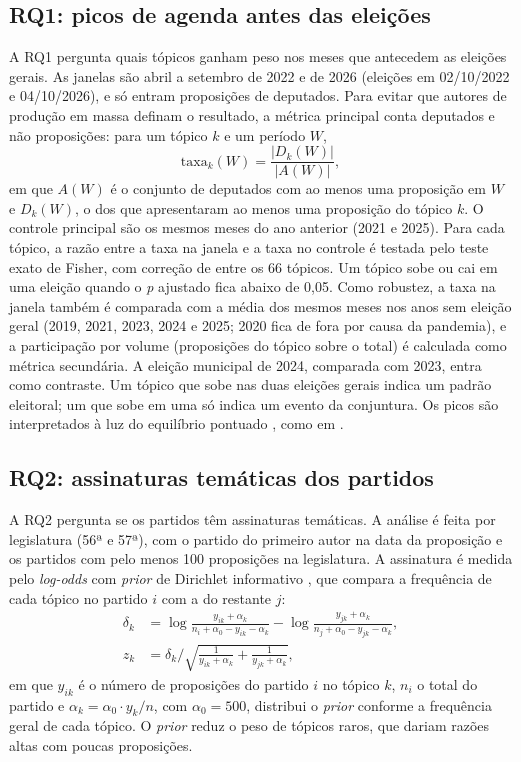 \subsection{RQ1: picos de agenda antes das eleições}
\label{subsec:rq1}

A RQ1 pergunta quais tópicos ganham peso nos meses que antecedem as eleições gerais. As janelas são abril a setembro de 2022 e de 2026 (eleições em 02/10/2022 e 04/10/2026), e só entram proposições de deputados. Para evitar que autores de produção em massa definam o resultado, a métrica principal conta deputados e não proposições: para um tópico $k$ e um período $W$,
\begin{equation}
\text{taxa}_k(W) = \frac{|D_k(W)|}{|A(W)|},
\end{equation}
em que $A(W)$ é o conjunto de deputados com ao menos uma proposição em $W$ e $D_k(W)$, o dos que apresentaram ao menos uma proposição do tópico $k$. O controle principal são os mesmos meses do ano anterior (2021 e 2025). Para cada tópico, a razão entre a taxa na janela e a taxa no controle é testada pelo teste exato de Fisher, com correção de \citet{benjamini1995controlling} entre os 66 tópicos. Um tópico sobe ou cai em uma eleição quando o \textit{p} ajustado fica abaixo de 0,05. Como robustez, a taxa na janela também é comparada com a média dos mesmos meses nos anos sem eleição geral (2019, 2021, 2023, 2024 e 2025; 2020 fica de fora por causa da pandemia), e a participação por volume (proposições do tópico sobre o total) é calculada como métrica secundária. A eleição municipal de 2024, comparada com 2023, entra como contraste. Um tópico que sobe nas duas eleições gerais indica um padrão eleitoral; um que sobe em uma só indica um evento da conjuntura. Os picos são interpretados à luz do equilíbrio pontuado \citep{baumgartner1993agendas}, como em \citet{greene2017exploring}.

\subsection{RQ2: assinaturas temáticas dos partidos}
\label{subsec:rq2}

A RQ2 pergunta se os partidos têm assinaturas temáticas. A análise é feita por legislatura (56ª e 57ª), com o partido do primeiro autor na data da proposição e os partidos com pelo menos 100 proposições na legislatura. A assinatura é medida pelo \textit{log-odds} com \textit{prior} de Dirichlet informativo \citep{monroe2008fightin}, que compara a frequência de cada tópico no partido $i$ com a do restante $j$:
\begin{align}
\delta_k &= \log\frac{y_{ik} + \alpha_k}{n_i + \alpha_0 - y_{ik} - \alpha_k} - \log\frac{y_{jk} + \alpha_k}{n_j + \alpha_0 - y_{jk} - \alpha_k}, \\
z_k &= \delta_k \bigg/ \sqrt{\frac{1}{y_{ik} + \alpha_k} + \frac{1}{y_{jk} + \alpha_k}},
\end{align}
em que $y_{ik}$ é o número de proposições do partido $i$ no tópico $k$, $n_i$ o total do partido e $\alpha_k = \alpha_0 \cdot y_k / n$, com $\alpha_0 = 500$, distribui o \textit{prior} conforme a frequência geral de cada tópico. O \textit{prior} reduz o peso de tópicos raros, que dariam razões altas com poucas proposições.

